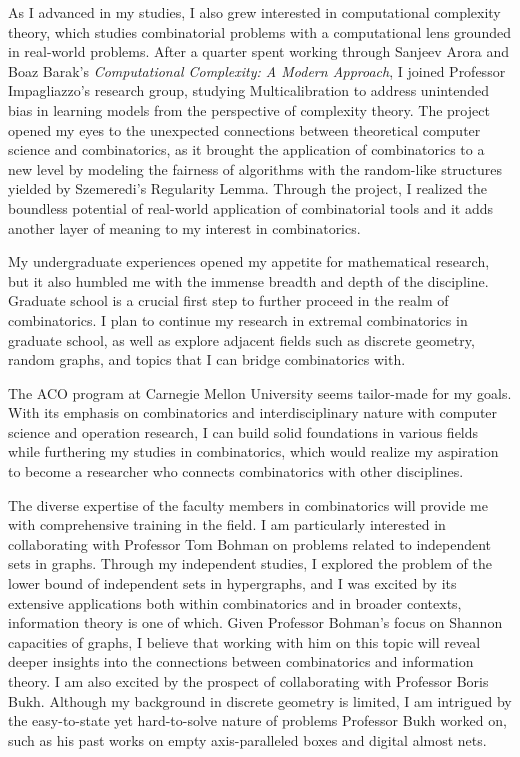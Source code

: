 \documentclass[12pt]{article}
\begin{document}
As I advanced in my studies, I also grew interested in computational complexity theory, which
studies combinatorial problems with a computational lens grounded in real-world problems. After a
quarter spent working through Sanjeev Arora and Boaz Barak's \textit{Computational Complexity: A
Modern Approach}\cite{arora2009computational}, I joined Professor Impagliazzo's research group, studying Multicalibration to
address unintended bias in learning models from the perspective of complexity theory. The project
opened my eyes to the unexpected connections between theoretical computer science and combinatorics,
as it brought the application of combinatorics to a new level by modeling the fairness of algorithms
with the random-like structures yielded by Szemeredi's Regularity Lemma. Through the project, I
realized the boundless potential of real-world application of combinatorial tools and it adds
another layer of meaning to my interest in combinatorics.

My undergraduate experiences opened my appetite for mathematical research, but it also humbled me
with the immense breadth and depth of the discipline. Graduate school is a crucial first step to
further proceed in the realm of combinatorics. I plan to continue my research in extremal
combinatorics in graduate school, as well as explore adjacent fields such as discrete geometry,
random graphs, and topics that I can bridge combinatorics with.

The ACO program at Carnegie Mellon University seems tailor-made for my goals. With its emphasis on
combinatorics and interdisciplinary nature with computer science and operation research, I can build
solid foundations in various fields while furthering my studies in combinatorics, which would
realize my aspiration to become a researcher who connects combinatorics with other disciplines. 

The diverse expertise of the faculty members in combinatorics will provide me with comprehensive
training in the field. I am particularly interested in collaborating with Professor Tom Bohman on
problems related to independent sets in graphs. Through my independent studies, I explored the
problem of the lower bound of independent sets in hypergraphs, and I was excited by its extensive
applications both within combinatorics and in broader contexts, information theory is one of which.
Given Professor Bohman's focus on Shannon capacities of graphs, I believe that working with him on
this topic will reveal deeper insights into the connections between combinatorics and information
theory. I am also excited by the prospect of collaborating with Professor Boris Bukh. Although my
background in discrete geometry is limited, I am intrigued by the easy-to-state yet hard-to-solve
nature of problems Professor Bukh worked on, such as his past works on empty axis-paralleled
boxes\cite{bukh2021axisparallelboxes} and digital almost nets\cite{bukh2022digitalnets}.
\end{document}
